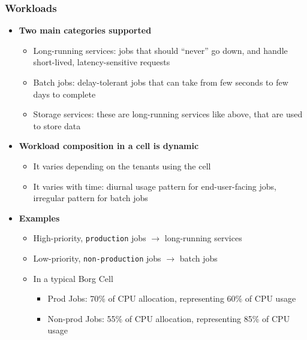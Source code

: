 \begin{frame}
\frametitle{Workloads}
\begin{itemize}
	\item {\bf Two main categories supported}
	\begin{itemize}
		\item Long-running services: jobs that should ``never'' go down, and handle short-lived, latency-sensitive requests
		\item Batch jobs: delay-tolerant jobs that can take from few seconds to few days to complete
		\item Storage services: these are long-running services like above, that are used to store data
	\end{itemize}
	\item {\bf Workload composition in a cell is dynamic}
	\begin{itemize}
		\item It varies depending on the tenants using the cell
		\item It varies with time: diurnal usage pattern for end-user-facing jobs, irregular pattern for batch jobs
	\end{itemize}
	\item {\bf Examples}
	\begin{itemize}
		\item High-priority, \texttt{production} jobs $\to$ long-running services
		\item Low-priority, \texttt{non-production} jobs $\to$ batch jobs
		\item In a typical Borg Cell
		\begin{itemize}
			\item Prod Jobs: 70\% of CPU allocation, representing 60\% of CPU usage
			\item Non-prod Jobs: 55\% of CPU allocation, representing 85\% of CPU usage
		\end{itemize}
	\end{itemize}
\end{itemize}
\end{frame}

